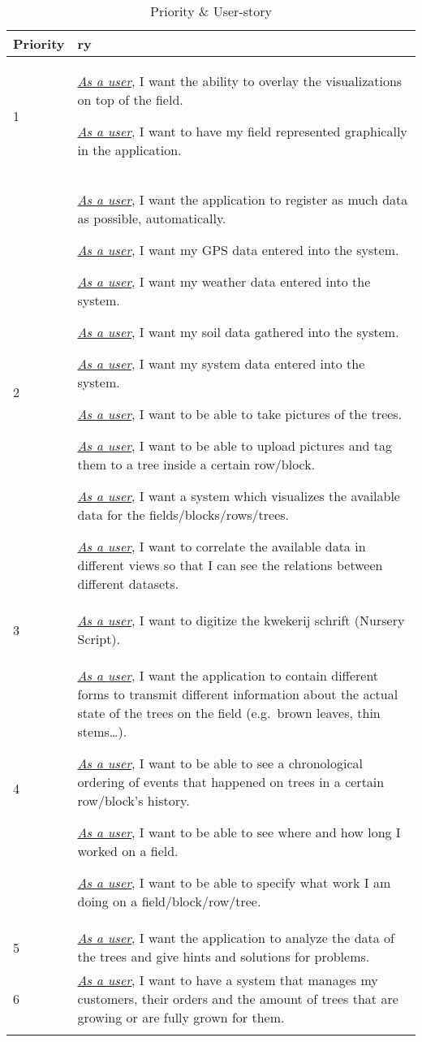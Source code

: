 	\begin{longtable}{ p{} p{} }
		Priority & \textbf{ry} \\     		\hline
		 1 & \underline{\textit{As a user}}, I want the ability to overlay the visualizations on top of the field. 
		
		\underline{\textit{As a user}}, I want to have my field represented graphically in the application. \\
		2 & \underline{\textit{As a user}}, I want the application to register as much data as possible, automatically.
		
		\underline{\textit{As a user}}, I want my GPS data entered into the system.
		
		\underline{\textit{As a user}}, I want my weather data entered into the system.
		
		\underline{\textit{As a user}}, I want my soil data gathered into the system.
		
		\underline{\textit{As a user}}, I want my system data entered into the system.
		
		\underline{\textit{As a user}}, I want to be able to take pictures of the trees.
		
		\underline{\textit{As a user}}, I want to be able to upload pictures and tag them to a tree inside a certain row/block.
		
		\underline{\textit{As a user}}, I want a system which visualizes the available data for the fields/blocks/rows/trees.
		
		\underline{\textit{As a user}}, I want to correlate the available data in different views so that I can see the relations between different datasets. \\
		3 & \underline{\textit{As a user}}, I want to digitize the kwekerij schrift (Nursery Script). \\
		4 & \underline{\textit{As a user}}, I want the application to contain different forms to transmit different information about the actual state of the trees on the field (e.g.~brown leaves, thin stems\ldots{}).
		
		\underline{\textit{As a user}}, I want to be able to see a chronological ordering of events that happened on trees in a certain row/block's history.
		
		\underline{\textit{As a user}}, I want to be able to see where and how long I worked on a field.
		
		\underline{\textit{As a user}}, I want to be able to specify what work I am doing on a field/block/row/tree.\\
		5 & \underline{\textit{As a user}}, I want the application to analyze the data of the trees and give hints and solutions for problems.\\
		6 & \underline{\textit{As a user}}, I want to have a system that manages my customers, their orders and the amount of trees that are growing or are fully grown for them.\\
		\caption{Priority \& User-story\label{tab:RequirementsAndUserStories}}
	\end{longtable}

